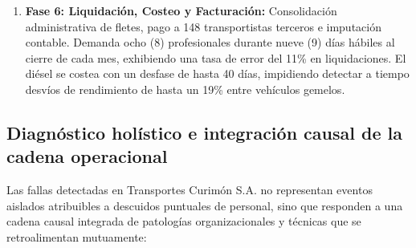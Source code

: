 \begin{enumerate}
  \item \textbf{Fase 6: Liquidación, Costeo y Facturación:} Consolidación administrativa de fletes, pago a 148 transportistas terceros e imputación contable. Demanda ocho (8) profesionales durante nueve (9) días hábiles al cierre de cada mes, exhibiendo una tasa de error del 11\% en liquidaciones. El diésel se costea con un desfase de hasta 40 días, impidiendo detectar a tiempo desvíos de rendimiento de hasta un 19\% entre vehículos gemelos.
\end{enumerate}

\subsection{Diagnóstico holístico e integración causal de la cadena operacional}\label{sec:2-diagnostico}

Las fallas detectadas en Transportes Curimón S.A. no representan eventos aislados atribuibles a descuidos puntuales de personal, sino que responden a una cadena causal integrada de patologías organizacionales y técnicas que se retroalimentan mutuamente:

